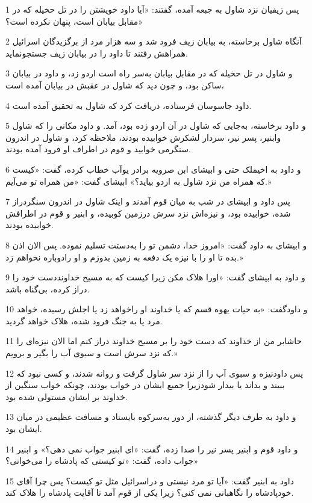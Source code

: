 \par 1 پس زیفیان نزد شاول به جبعه آمده، گفتند: «آیا داود خویشتن را در تل حخیله که در مقابل بیابان است، پنهان نکرده است؟»
\par 2 آنگاه شاول برخاسته، به بیابان زیف فرود شد و سه هزار مرد از برگزیدگان اسرائیل همراهش رفتند تا داود را در بیابان زیف جستجونماید.
\par 3 و شاول در تل حخیله که در مقابل بیابان به‌سر راه است اردو زد، و داود در بیابان ساکن بود، و چون دید که شاول در عقبش در بیابان آمده است،
\par 4 داود جاسوسان فرستاده، دریافت کرد که شاول به تحقیق آمده است.
\par 5 و داود برخاسته، به‌جایی که شاول در آن اردو زده بود، آمد. و داود مکانی را که شاول وابنیر، پسر نیر، سردار لشکرش خوابیده بودند، ملاحظه کرد، و شاول در اندرون سنگرمی خوابید و قوم در اطراف او فرود آمده بودند.
\par 6 و داود به اخیملک حتی و ابیشای ابن صرویه برادر یوآب خطاب کرده، گفت: «کیست که همراه من نزد شاول به اردو بیاید؟» ابیشای گفت: «من همراه تو می‌آیم.»
\par 7 پس داود و ابیشای در شب به میان قوم آمدند و اینک شاول در اندرون سنگردراز شده، خوابیده بود، و نیزه‌اش نزد سرش درزمین کوبیده، و ابنیر و قوم در اطرافش خوابیده بودند.
\par 8 و ابیشای به داود گفت: «امروز خدا، دشمن تو را به‌دستت تسلیم نموده. پس الان اذن بده تا او را با نیزه یک دفعه به زمین بدوزم و او رادوباره نخواهم زد.»
\par 9 و داود به ابیشای گفت: «اورا هلاک مکن زیرا کیست که به مسیح خداونددست خود را دراز کرده، بی‌گناه باشد.
\par 10 و داودگفت: «به حیات یهوه قسم که یا خداوند او راخواهد زد یا اجلش رسیده، خواهد مرد یا به جنگ فرود شده، هلاک خواهد گردید.
\par 11 حاشابر من از خداوند که دست خود را بر مسیح خداوند دراز کنم اما الان نیزه‌ای را که نزد سرش است و سبوی آب را بگیر و برویم.»
\par 12 پس داودنیزه و سبوی آب را از نزد سر شاول گرفت و روانه شدند، و کسی نبود که ببیند و بداند یا بیدار شودزیرا جمیع ایشان در خواب بودند، چونکه خواب سنگین از خداوند بر ایشان مستولی شده بود.
\par 13 و داود به طرف دیگر گذشته، از دور به‌سرکوه بایستاد و مسافت عظیمی در میان ایشان بود.
\par 14 و داود قوم و ابنیر پسر نیر را صدا زده، گفت: «ای ابنیر جواب نمی دهی؟» و ابنیر جواب داده، گفت: «تو کیستی که پادشاه را می‌خوانی؟»
\par 15 داود به ابنیر گفت: «آیا تو مرد نیستی و دراسرائیل مثل تو کیست؟ پس چرا آقای خودپادشاه را نگاهبانی نمی کنی؟ زیرا یکی از قوم آمد تا آقایت پادشاه را هلاک کند.
